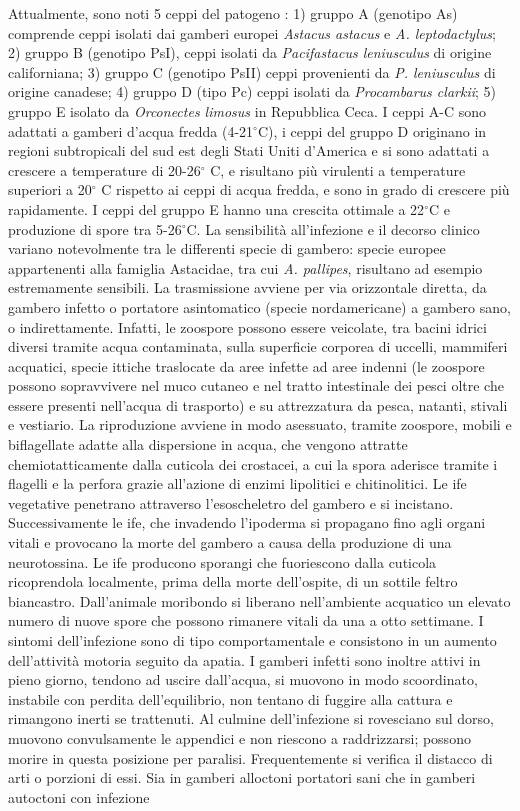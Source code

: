\documentclass[11pt,a4paper,italian,twoside,openany]{memoir}
\begin{document}
\begin{enumerate}[label={\alph*)}]
  Attualmente, sono noti 5 ceppi del patogeno \cite{Svoboda 2017}: 1) gruppo A (genotipo As) comprende ceppi isolati dai gamberi europei \emph{Astacus astacus} e \emph{A. leptodactylus}; 2) gruppo B (genotipo PsI), ceppi isolati da \emph{Pacifastacus leniusculus} di origine californiana; 3) gruppo C (genotipo PsII) ceppi provenienti da \emph{P. leniusculus} di origine canadese; 4) gruppo D (tipo Pc) ceppi isolati da \emph{Procambarus clarkii}; 5) gruppo E isolato da \emph{Orconectes limosus} in Repubblica Ceca. I ceppi A-C sono adattati a gamberi d'acqua fredda (4-21$^{\circ}$C), i ceppi del gruppo D originano in regioni subtropicali del sud est degli Stati Uniti d'America e si sono adattati a crescere a temperature di 20-26$^{\circ}$ C, e risultano più virulenti a temperature superiori a 20$^{\circ}$ C rispetto ai ceppi di acqua fredda, e sono in grado di crescere più rapidamente. I ceppi del gruppo E hanno una crescita ottimale a 22$^{\circ}$C e produzione di spore tra 5-26$^{\circ}$C. La sensibilità all'infezione e il decorso clinico variano notevolmente tra le differenti specie di gambero: specie europee appartenenti alla famiglia Astacidae, tra cui \emph{A. pallipes}, risultano ad esempio estremamente sensibili. La trasmissione avviene per via orizzontale diretta, da gambero infetto o portatore asintomatico (specie nordamericane) a gambero sano, o indirettamente. Infatti, le zoospore possono essere veicolate, tra bacini idrici diversi tramite acqua contaminata, sulla superficie corporea di uccelli, mammiferi acquatici, specie ittiche traslocate da aree infette ad aree indenni (le zoospore possono sopravvivere nel muco cutaneo e nel tratto intestinale dei pesci oltre che essere presenti nell'acqua di trasporto) e su attrezzatura da pesca, natanti, stivali e vestiario. La riproduzione avviene in modo asessuato, tramite zoospore, mobili e biflagellate adatte alla dispersione in acqua, che vengono attratte chemiotatticamente dalla cuticola dei crostacei, a cui la spora aderisce tramite i flagelli e la perfora grazie all'azione di enzimi lipolitici e chitinolitici. Le ife vegetative penetrano attraverso l'esoscheletro del gambero e si incistano. Successivamente le ife, che invadendo l'ipoderma si propagano fino agli organi vitali e provocano la morte del gambero a causa della produzione di una neurotossina. Le ife producono sporangi che fuoriescono dalla cuticola ricoprendola localmente, prima della morte dell'ospite, di un sottile feltro biancastro. Dall'animale moribondo si liberano nell'ambiente acquatico un elevato numero di nuove spore che possono rimanere vitali da una a otto settimane. I sintomi dell'infezione sono di tipo comportamentale e consistono in un aumento dell'attività motoria seguito da apatia. I gamberi infetti sono inoltre attivi in pieno giorno, tendono ad uscire dall'acqua, si muovono in modo scoordinato, instabile con perdita dell'equilibrio, non tentano di fuggire alla cattura e rimangono inerti se trattenuti. Al culmine dell'infezione si rovesciano sul dorso, muovono convulsamente le appendici e non riescono a raddrizzarsi; possono morire in questa posizione per paralisi. Frequentemente si verifica il distacco di arti o porzioni di essi. Sia in gamberi alloctoni portatori sani che in gamberi autoctoni con infezione 
\end{enumerate}
\end{document}
